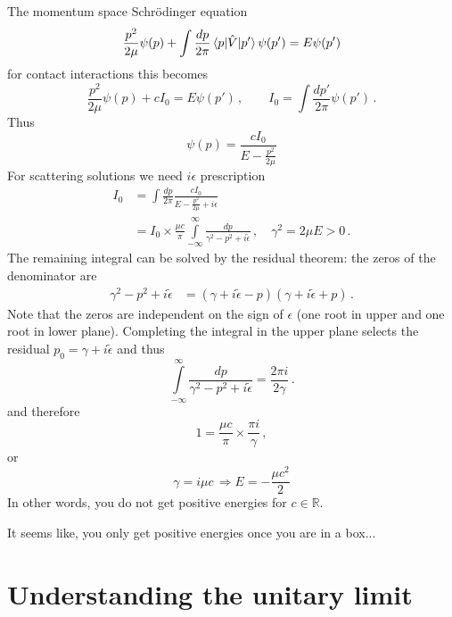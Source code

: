 \documentclass[
    aps,
    prl,
    showkeys,
    nofootinbib,
    floatfix
]{revtex4-1}
\begin{document}
The momentum space Schrödinger equation
\begin{equation}
	\frac{p^2}{2 \mu} \psi(p) + \int \frac{d p}{2\pi} \braket{p | \hat V | p'} \psi(p') = E \psi(p')
\end{equation}
for contact interactions this becomes
\begin{equation}
	\frac{p^2}{2 \mu} \psi(p) +  c I_0 = E \psi(p') \, , \qquad I_0 = \int \frac{d p'}{2\pi} \psi(p') \, .
\end{equation}
Thus
\begin{equation}
	\psi(p) = \frac{c I_0}{E - \frac{p^2}{2\mu}}
\end{equation}
For scattering solutions we need $i\epsilon$ prescription
\begin{align}
	I_0 &= \int \frac{d p}{2\pi}  \frac{c I_0}{E - \frac{p^2}{2\mu} + i \epsilon} \\
	&= I_0 \times \frac{\mu c }{\pi} \int\limits_{ - \infty}^{\infty} \frac{d p}{\gamma^2 - {p^2} + i \tilde\epsilon} \, , \quad \gamma^2 = 2 \mu E > 0\,.
\end{align}
The remaining integral can be solved by the residual theorem: the zeros of the denominator are
\begin{align}
	\gamma^2 - {p^2} + i \tilde\epsilon &= (\gamma + i \tilde\epsilon - p)(\gamma + i \tilde\epsilon + p) \, .
\end{align}
Note that the zeros are independent on the sign of $\epsilon$ (one root in upper and one root in lower plane).
Completing the integral in the upper plane selects the residual $p_0 = \gamma + i \tilde \epsilon$ and thus
\begin{equation}
	\int\limits_{ - \infty}^{\infty} \frac{d p}{\gamma^2 - {p^2} + i \tilde\epsilon}
	=
	 \frac{2 \pi i}{2 \gamma} \, .
\end{equation}
and therefore
\begin{equation}
	1 = \frac{\mu c}{\pi} \times \frac{\pi i}{\gamma} \, ,
\end{equation}
or
\begin{equation}
	\gamma = i \mu c \, \Rightarrow  E = - \frac{\mu c^2}{2}
\end{equation}
In other words, you do not get positive energies for $c \in \mathbb{R}$.

It seems like, you only get positive energies once you are in a box...

\clearpage
\section{Understanding the unitary limit}
\end{document}
